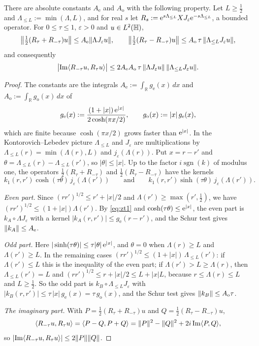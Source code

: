 \begin{lemma}\label{lem:clip}
There are absolute constants $A_{\mathrm e}$ and $A_{\mathrm o}$ with the following property. Let $L\ge\tfrac12$ and
$\Lambda_{\le L}:=\min(\Lambda,L)$, and for real $s$ let $R_s:=\mathrm{e}^{s\Lambda_{\le L}}XJ_\varepsilon\mathrm{e}^{-s\Lambda_{\le L}}$, a bounded
operator. For $0\le\tau\le1$, $\varepsilon>0$ and $u\in L^2(\mathbb{H})$,
\[
\bigl\|\tfrac12(R_\tau+R_{-\tau})u\bigr\|\le A_{\mathrm e}\lVert \Lambda J_\varepsilon u\rVert,\qquad
\bigl\|\tfrac12(R_\tau-R_{-\tau})u\bigr\|\le A_{\mathrm o}\,\tau\,\lVert \Lambda_{\le L}J_\varepsilon u\rVert,
\]
and consequently
\[
\bigl|\mathrm{Im}\langle R_{-\tau}u,R_\tau u\rangle\bigr|\le2A_{\mathrm e}A_{\mathrm o}\,\tau\,\lVert \Lambda J_\varepsilon u\rVert\,\lVert \Lambda_{\le L}J_\varepsilon u\rVert.
\]
\end{lemma}
\begin{proof}
The constants are the integrals $A_{\mathrm e}:=\int_{\mathbb R}g_{\mathrm e}(x)\,dx$ and $A_{\mathrm o}:=\int_{\mathbb R}g_{\mathrm o}(x)\,dx$ of
\[
g_{\mathrm e}(x):=\frac{(1+|x|)\,\mathrm{e}^{|x|}}{2\cosh(\pi x/2)},\qquad g_{\mathrm o}(x):=|x|\,g_{\mathrm e}(x),
\]
which are finite because $\cosh(\pi x/2)$ grows faster than $\mathrm{e}^{|x|}$.
In the Kontorovich--Lebedev picture $\Lambda_{\le L}$ and $J_\varepsilon$ are multiplications by $\Lambda_{\le L}(r)=\min(\Lambda(r),L)$ and
$j_\varepsilon(\Lambda(r))$. Put $x=r-r'$ and $\theta=\Lambda_{\le L}(r)-\Lambda_{\le L}(r')$, so $|\theta|\le|x|$. Up to the factor
$i\operatorname{sgn}(k)$ of modulus one, the operators $\tfrac12(R_\tau+R_{-\tau})$ and $\tfrac12(R_\tau-R_{-\tau})$ have the kernels
\[
k_1(r,r')\cosh(\tau\theta)\,j_\varepsilon(\Lambda(r'))\qquad\text{and}\qquad k_1(r,r')\sinh(\tau\theta)\,j_\varepsilon(\Lambda(r')).
\]

\emph{Even part.} Since $(rr')^{1/2}\le r'+|x|/2$ and $\Lambda(r')\ge\max(r',\tfrac12)$, we have
$(rr')^{1/2}\le(1+|x|)\Lambda(r')$. By \eqref{eq:zt1} and $\cosh(\tau\theta)\le\mathrm{e}^{|x|}$, the even part is
$k_A\circ\Lambda J_\varepsilon$ with a kernel $|k_A(r,r')|\le g_{\mathrm e}(r-r')$, and the Schur test gives $\lVert k_A\rVert\le A_{\mathrm e}$.

\emph{Odd part.} Here $|\sinh(\tau\theta)|\le\tau|\theta|\,\mathrm{e}^{|x|}$, and $\theta=0$ when $\Lambda(r)\ge L$ and
$\Lambda(r')\ge L$. In the remaining cases $(rr')^{1/2}\le(1+|x|)\,\Lambda_{\le L}(r')$: if $\Lambda(r')\le L$ this is the inequality
of the even part; if $\Lambda(r')>L\ge\Lambda(r)$, then $\Lambda_{\le L}(r')=L$ and
$(rr')^{1/2}\le r+|x|/2\le L+|x|L$, because $r\le\Lambda(r)\le L$ and $L\ge\tfrac12$. So the odd part is $k_B\circ\Lambda_{\le L}J_\varepsilon$ with
$|k_B(r,r')|\le\tau\,|x|\,g_{\mathrm e}(x)=\tau\,g_{\mathrm o}(x)$, and the Schur test gives $\lVert k_B\rVert\le A_{\mathrm o}\tau$.

\emph{The imaginary part.} With $P=\tfrac12(R_\tau+R_{-\tau})u$ and $Q=\tfrac12(R_\tau-R_{-\tau})u$,
\[\langle R_{-\tau}u,R_\tau u\rangle=\langle P-Q,P+Q\rangle=\lVert P\rVert^2-\lVert Q\rVert^2+2i\,\mathrm{Im}\langle P,Q\rangle,\]
so
$|\mathrm{Im}\langle R_{-\tau}u,R_\tau u\rangle|\le2\lVert P\rVert\lVert Q\rVert$.
\end{proof}

